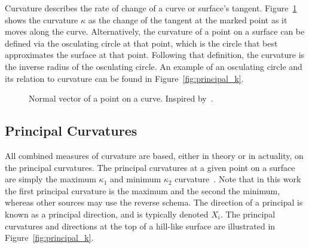 Curvature describes the rate of change of a curve or surface's tangent.
Figure~\ref{fig:tangent_on_curve} shows the curvature $\kappa$ as the change of the tangent at the marked point as it moves along the curve.
Alternatively, the curvature of a point on a surface can be defined via the osculating circle at that point, which is the circle that best approximates the surface at that point.
Following that definition, the curvature is the inverse radius of the osculating circle.
An example of an osculating circle and its relation to curvature can be found in Figure~\ref{fig:principal_k}.

\begin{figure}[ht]
	\centering
{}
	\caption{%
Normal vector of a point on a curve.
Inspired by~\cite{DDGAppIntro_12_smooth_curves}.}
	\label{fig:tangent_on_curve}
\end{figure}

\subsection{Principal Curvatures}
All combined measures of curvature are based, either in theory or in actuality, on the principal curvatures.
The principal curvatures at a given point on a surface are simply the maximum $\kappa_1$ and minimum $\kappa_2$ curvature~\cite{DDGAppIntro_17_smooth_k}.
Note that in this work the first principal curvature is the maximum and the second the minimum, whereas other sources may use the reverse schema.
The direction of a principal is known as a principal direction, and is typically denoted $X_i$.
The principal curvatures and directions at the top of a hill-like surface are illustrated in Figure~\ref{fig:principal_k}.

